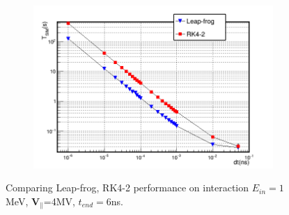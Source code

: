 \documentclass[a4paper,oneside,12pt]{report}
\numberwithin{equation}{chapter}
\begin{document}
{\begin{figure}[H]
    \begin{subfigure}{0.9\textwidth}
        \centering
        \includegraphics[width=\linewidth]{./figures/analiz/staticE_lf_rk2_dt-Tsim.png}
    \end{subfigure}
    \caption{Comparing Leap-frog, RK4-2 performance on \eE interaction $E_{in}=1$MeV, $\textbf{V}_{\parallel}$=4MV, $t_{end}=6$ns.}
    \label{fig:lf_rk2_par_stat_E_comparison}
\end{figure}\fi 
\begin{figure}[H]
    \centering
    \vspace{20pt}

\end{figure}}
\end{document}
